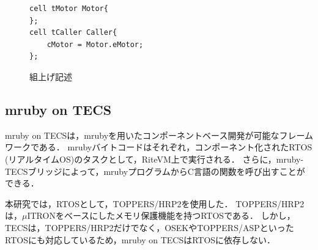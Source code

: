 \documentclass[submit,techrep]{ipsj}
\begin{document}
\begin{figure}[t]
\centering
\begin{lstlisting}
cell tMotor Motor{
};
cell tCaller Caller{
    cMotor = Motor.eMotor;
};
\end{lstlisting}
    \vspace{-2mm}
\caption{組上げ記述}
\vspace{-4mm}
\label{build}
\end{figure}

\vspace{-5mm} 
\subsection{mruby on TECS}
\label{sec:mruby on TECS}
mruby on TECSは，mrubyを用いたコンポーネントベース開発が可能なフレームワークである．
mrubyバイトコードはそれぞれ，コンポーネント化されたRTOS (リアルタイムOS)のタスクとして，RiteVM上で実行される．
さらに，mruby-TECSブリッジによって，mrubyプログラムからC言語の関数を呼び出すことができる．

本研究では，RTOSとして，TOPPERS/HRP2\cite{par:hr-tecs}を使用した．
TOPPERS/HRP2は，$\mu$ITRON\cite{par:microITRON}をベースにしたメモリ保護機能を持つRTOSである．
しかし，TECSは，TOPPERS/HRP2だけでなく，OSEK\cite{par:OSEK}やTOPPERS/ASP\cite{par:ASP}といったRTOSにも対応しているため，mruby on TECSはRTOSに依存しない．

\end{document}
